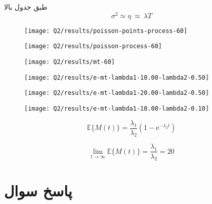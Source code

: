 \documentclass[12pt,onecolumn,a4paper]{article}
\theoremstyle{definition}
\newcommand\question{
	\section{پاسخ سوال \tartibi{section}}
}
\begin{document}
طبق جدول بالا
\begin{equation}
	\sigma^2 \simeq \eta \  \approx \  \lambda T
\end{equation}



		

	\begin{figure}[H]
		\centering
		\texttt{[image: Q2/results/poisson-points-process-60]}
		\caption{}
		\label{fig:poisson-points-process-60}
	\end{figure}

	\begin{figure}[H]
	\centering
	\texttt{[image: Q2/results/poisson-process-60]}
	\caption{}
	\label{fig:poisson-process-60}
\end{figure}




\begin{figure}[H]
	\centering
	\texttt{[image: Q2/results/mt-60]}
	\caption{}
	\label{fig:mt-60}
\end{figure}


\begin{figure}[H]
	\centering
	\texttt{[image: Q2/results/e-mt-lambda1-10.00-lambda2-0.50]}
	\caption{}
	\label{fig:e-mt-1}
\end{figure}


\begin{figure}[H]
	\centering
	\texttt{[image: Q2/results/e-mt-lambda1-20.00-lambda2-0.50]}
	\caption{}
	\label{fig:e-mt-2}
\end{figure}
\begin{figure}[H]
	\centering
	\texttt{[image: Q2/results/e-mt-lambda1-10.00-lambda2-0.10]}
	\caption{}
	\label{fig:e-mt-3}
\end{figure}


\begin{equation}
	\mathbb{E}\big\{M(t)\big\} = \frac{\lambda_1}{\lambda_2} (1 - \mathrm{e}^{-\lambda_2 t})
\end{equation}


\begin{equation}
	\lim\limits_{t\to\infty} \mathbb{E}\big\{M(t)\big\} = 
	 \frac{\lambda_1}{\lambda_2} = 20
\end{equation}

	\FloatBarrier
	\question%
\end{document}
